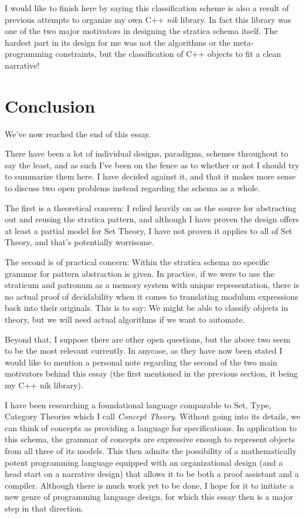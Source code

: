 \documentclass[twoside]{article}
\begin{document}
I would like to finish here by saying this classification scheme is also a result of previous attempts to organize my own C++
\emph{nik} library. In fact this library was one of the two major motivators in designing the stratica schema itself. The
hardest part in its design for me was not the algorithms or the meta-programming constraints, but the classification of
C++ objects to fit a clean narrative!

\newpage

\section*{Conclusion}

We've now reached the end of this essay.

There have been a lot of individual designs, paradigms, schemes throughout to say the least, and as such I've been on the fence
as to whether or not I should try to summarize them here. I have decided against it, and that it makes more sense to discuss two
open problems instead regarding the schema as a whole.

The first is a theoretical concern: I relied heavily on \cite{niksp} as the source for abstracting out and reusing the stratica
pattern, and although I have proven the design offers at least a partial model for Set Theory, I have not proven it applies
to all of Set Theory, and that's potentially worrisome.

The second is of practical concern: Within the stratica schema no specific grammar for pattern abstraction is given. In practice,
if we were to use the straticum and patronum as a memory system with unique representation, there is no actual proof of decidability
when it comes to translating modulum expressions back into their originals. This is to say: We might be able to classify objects
in theory, but we will need actual algorithms if we want to automate.

Beyond that, I suppose there are other open questions, but the above two seem to be the most relevant currently. In anycase,
as they have now been stated I would like to mention a personal note regarding the second of the two main motivators behind this
essay (the first mentioned in the previous section, it being my C++ nik library).

I have been researching a foundational language comparable to Set, Type, Category Theories which I call \emph{Concept Theory}.
Without going into its details, we can think of concepts as providing a language for specifications. In application to this
schema, the grammar of concepts are expressive enough to represent objects from all three of its models. This then admits
the possibility of a mathematically potent programming language equipped with an organizational design (and a head start on
a narrative design) that allows it to be both a proof assistant and a compiler. Although there is much work yet to be done,
I hope for it to initiate a new genre of programming language design, for which this essay then is a major step in that direction.
\end{document}
